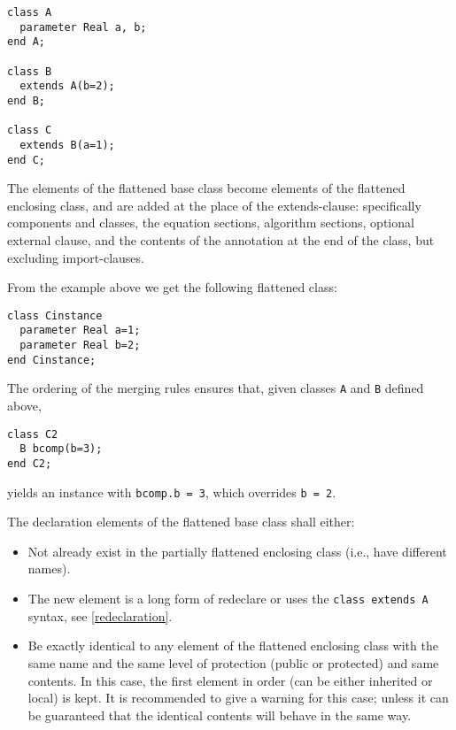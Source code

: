 \begin{example}
\begin{lstlisting}[language=modelica]
class A
  parameter Real a, b;
end A;

class B
  extends A(b=2);
end B;

class C
  extends B(a=1);
end C;
\end{lstlisting}
\end{example}

The elements of the flattened base class become elements of the
flattened enclosing class, and are added at the place of the
extends-clause: specifically components and classes, the equation
sections, algorithm sections, optional external clause, and the contents
of the annotation at the end of the class, but excluding import-clauses.

\begin{nonnormative}
From the example above we get the following flattened class:
\begin{lstlisting}[language=modelica]
class Cinstance
  parameter Real a=1;
  parameter Real b=2;
end Cinstance;
\end{lstlisting}

The ordering of the merging rules ensures that, given classes \lstinline!A!
and \lstinline!B! defined above,
\begin{lstlisting}[language=modelica]
class C2
  B bcomp(b=3);
end C2;
\end{lstlisting}
yields an instance with \lstinline!bcomp.b = 3!, which overrides \lstinline!b = 2!.
\end{nonnormative}

The declaration elements of the flattened base class shall either:
\begin{itemize}
\item
  Not already exist in the partially flattened enclosing class
  (i.e., have different names).
\item
  The new element is a long form of redeclare or uses the \lstinline!class extends A! syntax, see \autoref{redeclaration}.
\item
  Be exactly identical to any element of the flattened enclosing class
  with the same name and the same level of protection (public or
  protected) and same contents. In this case, the first element in order
  (can be either inherited or local) is kept. It is recommended to give
  a warning for this case; unless it can be guaranteed that the
  identical contents will behave in the same way.
\end{itemize}

